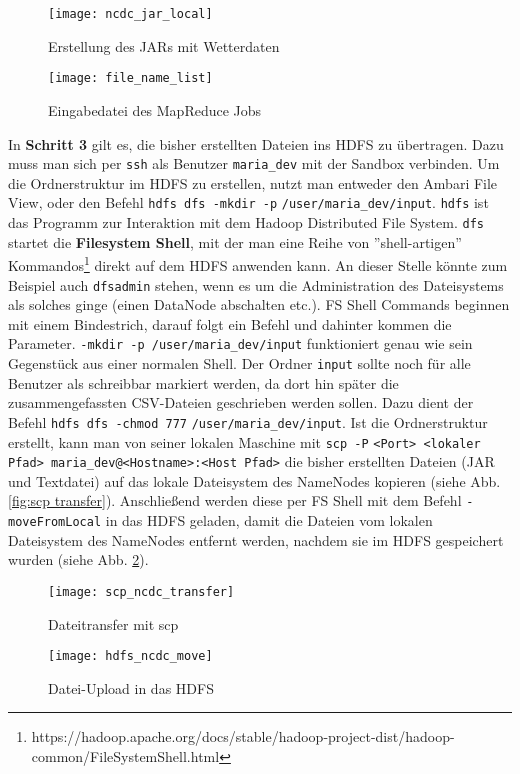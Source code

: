 \begin{figure}[ht]
    \centering
    \texttt{[image: ncdc\_jar\_local]}
    \caption[Erstellung des JARs mit Wetterdaten]{Erstellung des JARs mit Wetterdaten}
    \label{fig:ncdc jar local}
    \texttt{[image: file\_name\_list]}
    \caption[Eingabedatei des MapReduce Jobs]{Eingabedatei des MapReduce Jobs}
    \label{fig:file names txt local}
\end{figure}

In \textbf{Schritt 3} gilt es, die bisher erstellten Dateien ins HDFS zu übertragen. Dazu muss man sich per \verb|ssh| als Benutzer \verb|maria_dev| mit der Sandbox verbinden. Um die Ordnerstruktur im HDFS zu erstellen, nutzt man entweder den Ambari File View, oder den Befehl \verb|hdfs dfs -mkdir -p| \verb|/user/maria_dev/input|. \verb|hdfs| ist das Programm zur Interaktion mit dem Hadoop Distributed File System. \verb|dfs| startet die \textbf{Filesystem Shell}, mit der man eine Reihe von ''shell-artigen'' Kommandos\footnote{https://hadoop.apache.org/docs/stable/hadoop-project-dist/hadoop-common/FileSystemShell.html} direkt auf dem HDFS anwenden kann. An dieser Stelle könnte zum Beispiel auch \verb|dfsadmin| stehen, wenn es um die Administration des Dateisystems als solches ginge (einen DataNode abschalten etc.). FS Shell Commands beginnen mit einem Bindestrich, darauf folgt ein Befehl und dahinter kommen die Parameter. \verb|-mkdir -p /user/maria_dev/input| funktioniert genau wie sein Gegenstück aus einer normalen Shell. Der Ordner \verb|input| sollte noch für alle Benutzer als schreibbar markiert werden, da dort hin später die zusammengefassten CSV-Dateien geschrieben werden sollen. Dazu dient der Befehl \verb|hdfs dfs -chmod 777| \verb|/user/maria_dev/input|. Ist die Ordnerstruktur erstellt, kann man von seiner lokalen Maschine mit \verb|scp -P| \verb|<Port> <lokaler Pfad> maria_dev@<Hostname>:<Host Pfad>| die bisher erstellten Dateien (JAR und Textdatei) auf das lokale Dateisystem des NameNodes kopieren (siehe Abb. \ref{fig:scp transfer}). Anschließend werden diese per FS Shell mit dem Befehl \verb|-moveFromLocal| in das HDFS geladen, damit die Dateien vom lokalen Dateisystem des NameNodes entfernt werden, nachdem sie im HDFS gespeichert wurden (siehe Abb. \ref{fig:hdfs move}).

\begin{figure}[ht]
    \centering
    \texttt{[image: scp\_ncdc\_transfer]}
    \caption[Dateitransfer mit scp]{Dateitransfer mit scp}
    \label{fig:scp transfer}
    \texttt{[image: hdfs\_ncdc\_move]}
    \caption[Datei-Upload in das HDFS]{Datei-Upload in das HDFS}
    \label{fig:hdfs move}
\end{figure}

